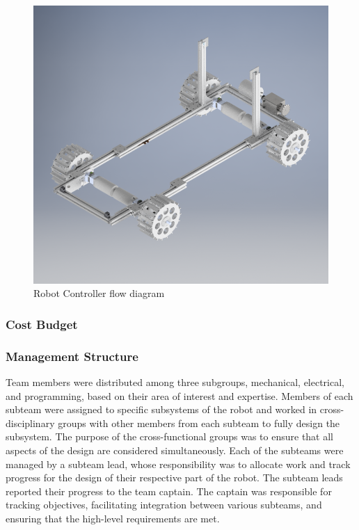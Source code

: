 \documentclass[class=article, crop=false]{standalone}
\begin{document}
	\FloatBarrier
	\begin{figure}[h]
	\centering
	 \includegraphics[width=0.6\linewidth]{09_Figures/frame-cad.jpg}
	 \caption{Robot Controller flow diagram}
	 \label{fig:final-cad}
	\end{figure}
	\FloatBarrier
	
	\subsubsection{Cost Budget}
	
	\subsubsection{Management Structure}
	Team members were distributed among three subgroups, mechanical, electrical, and programming, based on their area of interest and expertise. Members of each subteam were assigned to specific subsystems of the robot and worked in cross-disciplinary groups with other members from each subteam to fully design the subsystem. The purpose of the cross-functional groups was to ensure that all aspects of the design are considered simultaneously. Each of the subteams were managed by a subteam lead, whose responsibility was to allocate work and track progress for the design of their respective part of the robot. The subteam leads reported their progress to the team captain. The captain was responsible for tracking objectives, facilitating integration between various subteams, and ensuring that the high-level requirements are met.



	
	
	


	
\end{document}
